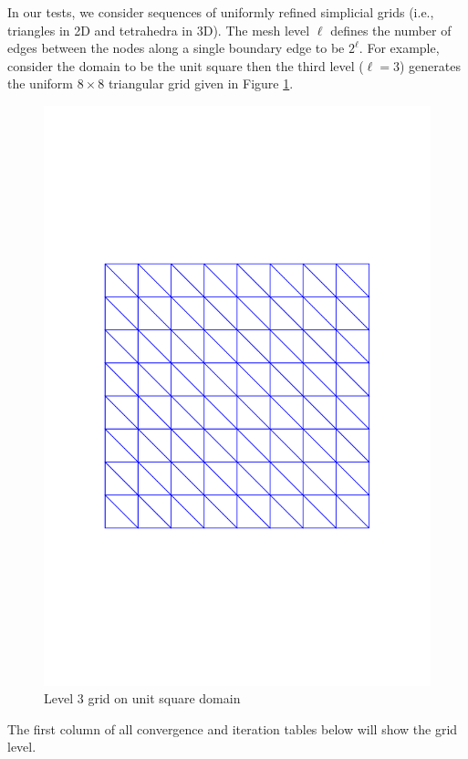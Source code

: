In our tests, we consider sequences of uniformly refined simplicial grids (i.e., triangles in 2D and tetrahedra in 3D). The mesh level $\ell$ defines the number of edges between the nodes along a single boundary edge to be $2^{\ell}$. For example, consider the domain to be the unit square then the third level ($\ell = 3$)  generates the uniform $8\times 8$ triangular grid given in Figure \ref{fig:2Dmesh}.
\begin{figure}[h!]
  \centering
    \includegraphics[scale=.5]{../Results/Figures/dolfin_plot_1}
    \caption{Level $3$ grid on unit square domain}
  \label{fig:2Dmesh}
\end{figure}
The first column of all convergence and iteration tables below will show the grid level.

